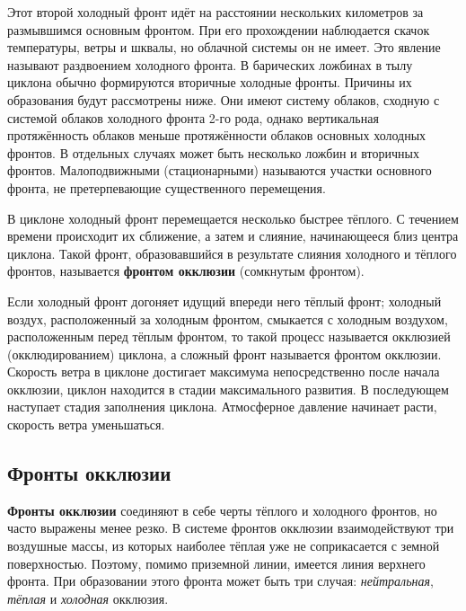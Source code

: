 \documentclass[a4paper, 12pt, twoside, draft, book, russian, fittopage, cyremdash, openright]{ncc}
\begin{document}
Этот второй холодный фронт идёт на расстоянии нескольких километров за
размывшимся основным фронтом. При его прохождении наблюдается скачок
температуры, ветры и шквалы, но облачной системы он не имеет. Это
явление называют раздвоением холодного фронта.  В барических ложбинах
в тылу циклона обычно формируются вторичные холодные фронты. Причины
их образования будут рассмотрены ниже. Они имеют систему облаков,
сходную с системой облаков холодного фронта 2-го рода, однако
вертикальная протяжённость облаков меньше протяжённости облаков
основных холодных фронтов. В отдельных случаях может быть несколько
ложбин и вторичных фронтов.  Малоподвижными (стационарными) называются
участки основного фронта, не претерпевающие существенного
перемещения.

В циклоне холодный фронт перемещается несколько быстрее тёплого. С
течением времени происходит их сближение, а затем и слияние,
начинающееся близ центра циклона. Такой фронт, образовавшийся в
результате слияния холодного и тёплого фронтов, называется
\textbf{фронтом окклюзии} (сомкнутым
фронтом).

Если холодный фронт догоняет идущий впереди него тёплый фронт;
холодный воздух, расположенный за холодным фронтом, смыкается с
холодным воздухом, расположенным перед тёплым фронтом, то такой
процесс называется окклюзией (окклюдированием) циклона, а сложный
фронт называется фронтом окклюзии. Скорость ветра в циклоне достигает
максимума непосредственно после начала окклюзии, циклон находится в
стадии максимального развития. В последующем наступает стадия
заполнения циклона. Атмосферное давление начинает расти, скорость
ветра уменьшаться.

\subsection{Фронты окклюзии}
\label{sec:ocl_front}

\textbf{Фронты окклюзии} соединяют в себе черты
тёплого и холодного фронтов, но часто выражены менее резко.  В системе
фронтов окклюзии взаимодействуют три воздушные массы, из которых
наиболее тёплая уже не соприкасается с земной поверхностью. Поэтому,
помимо приземной линии, имеется линия верхнего фронта. При
образовании этого фронта может быть три случая:
\textit{нейтральная},
\textit{тёплая} и
\textit{холодная} окклюзия.
\end{document}
